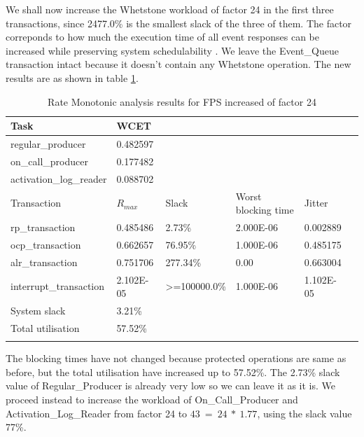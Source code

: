 \documentclass{article}
\begin{document}
We shall now increase the Whetstone workload of factor 24 in the first three transactions, since 2477.0\% is the smallest slack of the three of them. The factor correponds to how much the execution time of all event responses can be increased while preserving system schedulability \cite{practitioner-growth}. We leave the Event\_Queue transaction intact because it doesn't contain any Whetstone operation. The new results are as shown in table \ref{tab:rm-fps-24}.

\begin{longtable}{llllll}
   \toprule
   Task & WCET \\
   \midrule
   regular\_producer & 0.482597 \\
   on\_call\_producer & 0.177482 \\
   activation\_log\_reader & 0.088702 \\
   \toprule
   \toprule
   Transaction & $R_{max}$ & Slack & Worst blocking time & Jitter \\
   \midrule
   rp\_transaction & 0.485486  & 2.73\% &  2.000E-06 & 0.002889 \\
   ocp\_transaction & 0.662657 & 76.95\% & 1.000E-06 & 0.485175 \\
   alr\_transaction & 0.751706 & 277.34\% & 0.00 & 0.663004 \\
   interrupt\_transaction & 2.102E-05 & >=100000.0\% & 1.000E-06 & 1.102E-05 \\
   \toprule
   \toprule
   System slack & 3.21\% \\
   Total utilisation & 57.52\% \\
   \bottomrule
   \caption{Rate Monotonic analysis results for FPS increased of factor 24}
\label{tab:rm-fps-24}
\end{longtable}

The blocking times have not changed because protected operations are same as before, but the total utilisation have increased up to 57.52\%. The 2.73\% slack value of Regular\_Producer is already very low so we can leave it as it is. We proceed instead to increase the workload of On\_Call\_Producer and Activation\_Log\_Reader from factor 24 to $43\ =\ 24\ *\ 1.77$, using the slack value 77\%.
\end{document}
